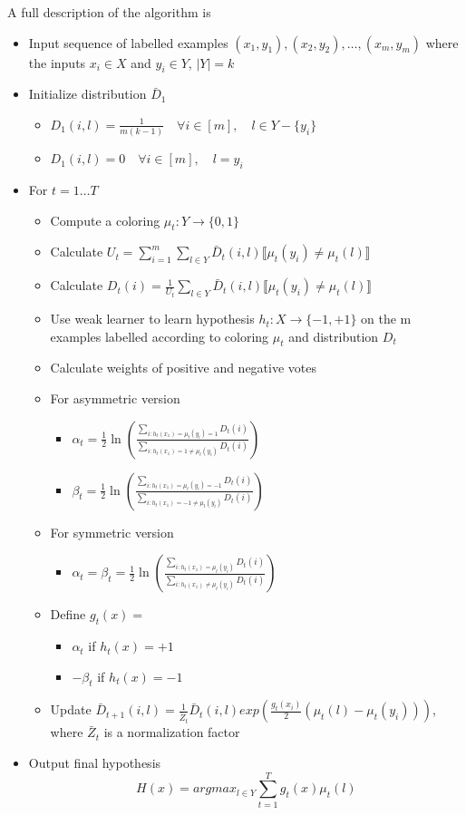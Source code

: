\documentclass[11pt]{article}
\begin{document}
A full description of the algorithm is
\begin{itemize}
\item Input sequence of labelled examples $(x_1, y_1), (x_2, y_2), \ldots, (x_m, y_m)$ where the inputs $x_i \in X$ and $y_i \in Y$, $|Y| = k$
\item Initialize distribution $\bar D_1$
\begin{itemize}
\item $D_1(i, l) = \frac{1}{m(k-1)}\quad \forall i \in [m],\quad l \in Y - \{y_i\}$
\item $D_1(i, l) = 0 \quad \forall i \in [m],\quad l = y_i$
\end{itemize}
\item For $t =  1 \ldots T$
\begin{itemize}
\item Compute a coloring $\mu_t : Y \rightarrow \{0,1\}$
\item Calculate $U_t = \sum_{i=1}^m \sum_{l \in Y} \bar D_t(i,l) \llbracket \mu_t(y_i) \neq \mu_t(l)\rrbracket$
\item Calculate $D_t(i) = \frac{1}{U_t} \sum_{l \in Y} \bar D_t(i,l) \llbracket \mu_t(y_i) \neq \mu_t(l)\rrbracket$
\item Use weak learner to learn hypothesis $h_t : X \rightarrow \{-1,+1\}$ on the m examples labelled according to coloring $\mu_t$ and distribution $D_t$
\item Calculate weights of positive and negative votes
\item For asymmetric version
\begin{itemize}
\item $\alpha_t = \frac{1}{2} \ln \left(\frac{\sum_{i:h_t(x_1) = \mu_t(y_i) = 1} D_t(i)}{\sum_{i:h_t(x_1) = 1 \neq \mu_t(y_i) } D_t(i)} \right)$
\item $\beta_t = \frac{1}{2} \ln \left(\frac{\sum_{i:h_t(x_1) = \mu_t(y_i) = -1} D_t(i)}{\sum_{i:h_t(x_1) = -1 \neq \mu_t(y_i) } D_t(i)} \right)$
\end{itemize}
\item For symmetric version
\begin{itemize}
\item $\alpha_t = \beta_t = \frac{1}{2} \ln \left(\frac{\sum_{i:h_t(x_1) = \mu_t(y_i)} D_t(i)}{\sum_{i:h_t(x_1) \neq \mu_t(y_i) } D_t(i)} \right)$
\end{itemize}
\item Define $g_t(x) = $
\begin{itemize}
\item $\alpha_t$ if $h_t(x) = +1$
\item $-\beta_t$ if $h_t(x) = -1$
\end{itemize}
\item Update $\bar D_{t+1}(i,l) = \frac{1}{\bar Z_t} \bar D_t(i,l) exp(\frac{g_t(x_i)}{2}(\mu_t(l)-\mu_t(y_i)))$, where $\bar Z_t$ is a normalization factor
\end{itemize}
\item Output final hypothesis $$H(x) = argmax_{l \in Y} \sum_{t=1}^T g_t(x)\mu_t(l)$$
\end{itemize}
\end{document}

